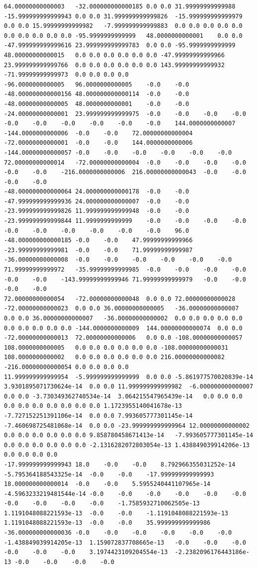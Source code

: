 \documentclass[12pt]{report} %
\begin{document}
\begin{landscape}
\begin{lstlisting}[numbers=none, basicstyle=\ttfamily\tiny, captionpos=b, caption={Matriz de coeficientes $W = G^{-1}$ ($54\times54$) calculada con Julia, sin redondear.}, label=cod:W-julia]
64.00000000000003	-32.000000000000185	0.0	0.0	31.99999999999988	-15.999999999999943	0.0	0.0	31.999999999999826	-15.999999999999979	0.0	0.0	15.99999999999982	-7.999999999999883	0.0	0.0	0.0	0.0	0.0	0.0	0.0	0.0	0.0	0.0	-95.9999999999999	48.0000000000001	0.0	0.0	-47.999999999999616	23.999999999999783	0.0	0.0	-95.9999999999999	48.00000000000015	0.0	0.0	0.0	0.0	0.0	0.0	-47.99999999999966	23.999999999999766	0.0	0.0	0.0	0.0	0.0	0.0	143.99999999999932	-71.99999999999973	0.0	0.0	0.0	0.0
-96.0000000000005	96.0000000000005	-0.0	-0.0	-48.000000000000156	48.000000000000114	-0.0	-0.0	-48.00000000000005	48.0000000000001	-0.0	-0.0	-24.00000000000001	23.999999999999975	-0.0	-0.0	-0.0	-0.0	-0.0	-0.0	-0.0	-0.0	-0.0	-0.0	144.0000000000007	-144.0000000000006	-0.0	-0.0	72.00000000000004	-72.00000000000001	-0.0	-0.0	144.0000000000006	-144.00000000000057	-0.0	-0.0	-0.0	-0.0	-0.0	-0.0	72.00000000000014	-72.00000000000004	-0.0	-0.0	-0.0	-0.0	-0.0	-0.0	-216.0000000000006	216.00000000000043	-0.0	-0.0	-0.0	-0.0
-48.000000000000064	24.000000000000178	-0.0	-0.0	-47.999999999999936	24.000000000000007	-0.0	-0.0	-23.999999999999826	11.999999999999948	-0.0	-0.0	-23.999999999999844	11.9999999999999	-0.0	-0.0	-0.0	-0.0	-0.0	-0.0	-0.0	-0.0	-0.0	-0.0	96.0	-48.000000000000185	-0.0	-0.0	47.99999999999966	-23.99999999999981	-0.0	-0.0	71.99999999999987	-36.00000000000008	-0.0	-0.0	-0.0	-0.0	-0.0	-0.0	71.99999999999972	-35.99999999999985	-0.0	-0.0	-0.0	-0.0	-0.0	-0.0	-143.99999999999946	71.99999999999979	-0.0	-0.0	-0.0	-0.0
72.00000000000054	-72.00000000000048	0.0	0.0	72.00000000000028	-72.00000000000023	0.0	0.0	36.00000000000005	-36.00000000000007	0.0	0.0	36.00000000000007	-36.00000000000002	0.0	0.0	0.0	0.0	0.0	0.0	0.0	0.0	0.0	0.0	-144.0000000000009	144.00000000000074	0.0	0.0	-72.00000000000013	72.00000000000006	0.0	0.0	-108.00000000000057	108.0000000000005	0.0	0.0	0.0	0.0	0.0	0.0	-108.00000000000031	108.0000000000002	0.0	0.0	0.0	0.0	0.0	0.0	216.00000000000082	-216.00000000000054	0.0	0.0	0.0	0.0
11.999999999999954	-5.999999999999999	0.0	0.0	-5.861977570020839e-14	3.9301895071730624e-14	0.0	0.0	11.999999999999982	-6.000000000000007	0.0	0.0	-3.730349362740534e-14	3.064215547965439e-14	0.0	0.0	0.0	0.0	0.0	0.0	0.0	0.0	0.0	0.0	1.1723955140041678e-13	-7.727152251391106e-14	0.0	0.0	7.993605777301145e-14	-7.460698725481068e-14	0.0	0.0	-23.999999999999964	12.00000000000002	0.0	0.0	0.0	0.0	0.0	0.0	9.858780458671413e-14	-7.993605777301145e-14	0.0	0.0	0.0	0.0	0.0	0.0	-2.1316282072803054e-13	1.438849039914206e-13	0.0	0.0	0.0	0.0
-17.999999999999943	18.0	-0.0	-0.0	8.792966355031252e-14	-5.795364188543325e-14	-0.0	-0.0	-17.999999999999993	18.000000000000014	-0.0	-0.0	5.5955240441107965e-14	-4.5963233219481544e-14	-0.0	-0.0	-0.0	-0.0	-0.0	-0.0	-0.0	-0.0	-0.0	-0.0	-1.7585932710062505e-13	1.1191048088221593e-13	-0.0	-0.0	-1.1191048088221593e-13	1.1191048088221593e-13	-0.0	-0.0	35.999999999999986	-36.000000000000036	-0.0	-0.0	-0.0	-0.0	-0.0	-0.0	-1.438849039914205e-13	1.159072837708665e-13	-0.0	-0.0	-0.0	-0.0	-0.0	-0.0	3.1974423109204554e-13	-2.2382096176443186e-13	-0.0	-0.0	-0.0	-0.0

\end{lstlisting}
\end{landscape}
\end{document}
